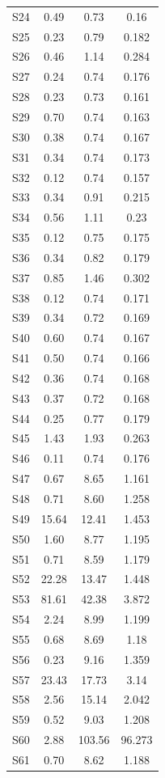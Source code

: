 {\begin{longtable}{l S[table-format=7.2] S[table-format=7.2] S[table-format=7.3]}
S24 & 0.49 & 0.73 & 0.16 \\
S25 & 0.23 & 0.79 & 0.182 \\
S26 & 0.46 & 1.14 & 0.284 \\
S27 & 0.24 & 0.74 & 0.176 \\
S28 & 0.23 & 0.73 & 0.161 \\
S29 & 0.70 & 0.74 & 0.163 \\
S30 & 0.38 & 0.74 & 0.167 \\
S31 & 0.34 & 0.74 & 0.173 \\
S32 & 0.12 & 0.74 & 0.157 \\
S33 & 0.34 & 0.91 & 0.215 \\
S34 & 0.56 & 1.11 & 0.23 \\
S35 & 0.12 & 0.75 & 0.175 \\
S36 & 0.34 & 0.82 & 0.179 \\
S37 & 0.85 & 1.46 & 0.302 \\
S38 & 0.12 & 0.74 & 0.171 \\
S39 & 0.34 & 0.72 & 0.169 \\
S40 & 0.60 & 0.74 & 0.167 \\
S41 & 0.50 & 0.74 & 0.166 \\
S42 & 0.36 & 0.74 & 0.168 \\
S43 & 0.37 & 0.72 & 0.168 \\
S44 & 0.25 & 0.77 & 0.179 \\
S45 & 1.43 & 1.93 & 0.263 \\
S46 & 0.11 & 0.74 & 0.176 \\
S47 & 0.67 & 8.65 & 1.161 \\
S48 & 0.71 & 8.60 & 1.258 \\
S49 & 15.64 & 12.41 & 1.453 \\
S50 & 1.60 & 8.77 & 1.195 \\
S51 & 0.71 & 8.59 & 1.179 \\
S52 & 22.28 & 13.47 & 1.448 \\
S53 & 81.61 & 42.38 & 3.872 \\
S54 & 2.24 & 8.99 & 1.199 \\
S55 & 0.68 & 8.69 & 1.18 \\
S56 & 0.23 & 9.16 & 1.359 \\
S57 & 23.43 & 17.73 & 3.14 \\
S58 & 2.56 & 15.14 & 2.042 \\
S59 & 0.52 & 9.03 & 1.208 \\
S60 & 2.88 & 103.56 & 96.273 \\
S61 & 0.70 & 8.62 & 1.188 \\

\end{longtable}}
